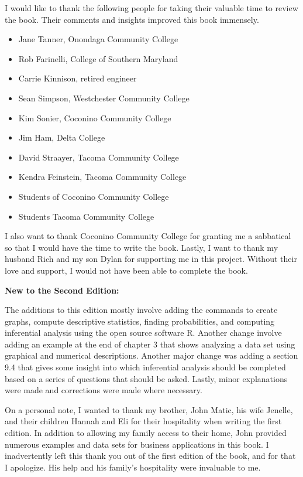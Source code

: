 \documentclass[]{book}
\providecommand{\tightlist}{%
  \setlength{\itemsep}{0pt}\setlength{\parskip}{0pt}}
\begin{document}
I would like to thank the following people for taking their valuable time to review the book. Their comments and insights improved this book immensely.

\begin{itemize}
\tightlist
\item
  Jane Tanner, Onondaga Community College
\item
  Rob Farinelli, College of Southern Maryland
\item
  Carrie Kinnison, retired engineer
\item
  Sean Simpson, Westchester Community College
\item
  Kim Sonier, Coconino Community College
\item
  Jim Ham, Delta College
\item
  David Straayer, Tacoma Community College
\item
  Kendra Feinstein, Tacoma Community College
\item
  Students of Coconino Community College
\item
  Students Tacoma Community College
\end{itemize}

I also want to thank Coconino Community College for granting me a sabbatical so that I would have the time to write the book. Lastly, I want to thank my husband Rich and my son Dylan for supporting me in this project. Without their love and support, I would not have been able to complete the book.

\textbf{New to the Second Edition:}

The additions to this edition mostly involve adding the commands to create graphs, compute descriptive statistics, finding probabilities, and computing inferential analysis using the open source software R. Another change involve adding an example at the end of chapter 3 that shows analyzing a data set using graphical and numerical descriptions. Another major change was adding a section 9.4 that gives some insight into which inferential analysis should be completed based on a series of questions that should be asked. Lastly, minor explanations were made and corrections were made where necessary.

On a personal note, I wanted to thank my brother, John Matic, his wife Jenelle, and their children Hannah and Eli for their hospitality when writing the first edition. In addition to allowing my family access to their home, John provided numerous examples and data sets for business applications in this book. I inadvertently left this thank you out of the first edition of the book, and for that I apologize. His help and his family's hospitality were invaluable to me.
\end{document}
